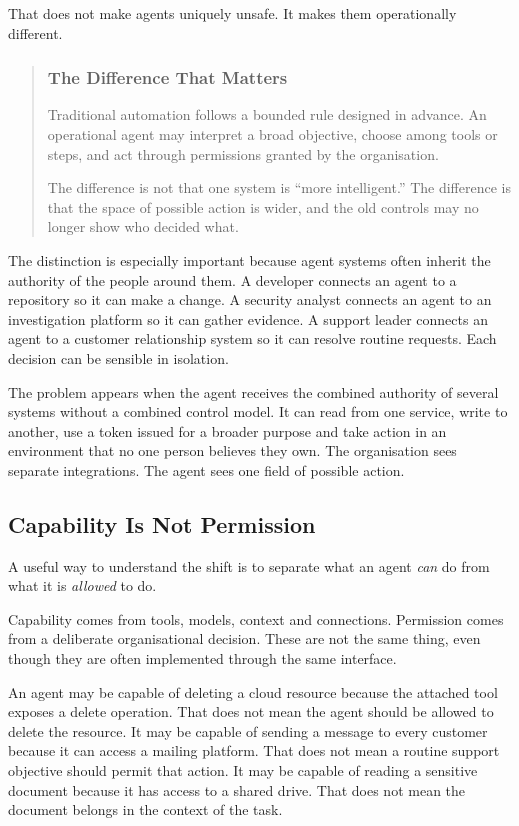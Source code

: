 That does not make agents uniquely unsafe. It makes them operationally
different.

\begin{quote}
\subsubsection{The Difference That
Matters}\label{the-difference-that-matters}

Traditional automation follows a bounded rule designed in advance. An
operational agent may interpret a broad objective, choose among tools or
steps, and act through permissions granted by the organisation.

The difference is not that one system is ``more intelligent.'' The
difference is that the space of possible action is wider, and the old
controls may no longer show who decided what.
\end{quote}

The distinction is especially important because agent systems often
inherit the authority of the people around them. A developer connects an
agent to a repository so it can make a change. A security analyst
connects an agent to an investigation platform so it can gather
evidence. A support leader connects an agent to a customer relationship
system so it can resolve routine requests. Each decision can be sensible
in isolation.

The problem appears when the agent receives the combined authority of
several systems without a combined control model. It can read from one
service, write to another, use a token issued for a broader purpose and
take action in an environment that no one person believes they own. The
organisation sees separate integrations. The agent sees one field of
possible action.

\subsection{Capability Is Not
Permission}\label{capability-is-not-permission}

A useful way to understand the shift is to separate what an agent
\emph{can} do from what it is \emph{allowed} to do.

Capability comes from tools, models, context and connections. Permission
comes from a deliberate organisational decision. These are not the same
thing, even though they are often implemented through the same
interface.

An agent may be capable of deleting a cloud resource because the
attached tool exposes a delete operation. That does not mean the agent
should be allowed to delete the resource. It may be capable of sending a
message to every customer because it can access a mailing platform. That
does not mean a routine support objective should permit that action. It
may be capable of reading a sensitive document because it has access to
a shared drive. That does not mean the document belongs in the context
of the task.

